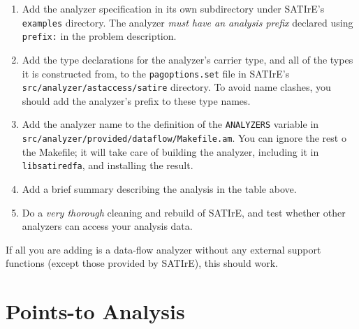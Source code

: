 \documentclass[a4paper,12pt]{report}
\begin{document}
\begin{enumerate}
\item Add the analyzer specification in its own subdirectory under SATIrE's
\texttt{examples} directory. The analyzer \emph{must have an analysis
prefix} declared using \texttt{prefix:} in the problem description.
\item Add the type declarations for the analyzer's carrier type, and all of
the types it is constructed from, to the \texttt{pagoptions.set} file in
SATIrE's \texttt{src/analyzer/astaccess/satire} directory. To avoid name
clashes, you should add the analyzer's prefix to these type names.
\item Add the analyzer name to the definition of the \texttt{ANALYZERS}
variable in \texttt{src/analyzer/provided/dataflow/Makefile.am}. You can
ignore the rest o the Makefile; it will take care of building the analyzer,
including it in \texttt{libsatiredfa}, and installing the result.
\item Add a brief summary describing the analysis in the table above.
\item Do a \emph{very thorough} cleaning and rebuild of SATIrE, and test
whether other analyzers can access your analysis data.
\end{enumerate}

If all you are adding is a data-flow analyzer without any external support
functions (except those provided by SATIrE), this should work.

\section{Points-to Analysis}
\label{sec:analysis_pointsto}
\end{document}
